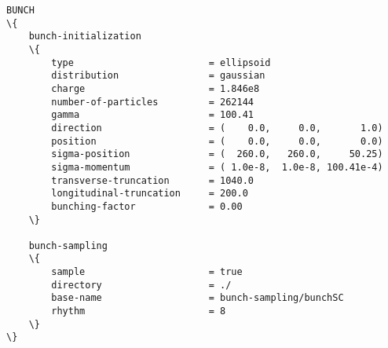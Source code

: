 \begin{appendices}
\begin{snugshade}
\begin{Verbatim}[fontsize=\footnotesize, tabsize=4, fontfamily=courier, fontseries=b, commandchars=\\\{\}, obeytabs]
BUNCH
\{
	bunch-initialization
	\{
		type						= ellipsoid
		distribution				= gaussian
		charge						= 1.846e8
		number-of-particles			= 262144
		gamma						= 100.41
		direction					= (    0.0,     0.0,       1.0)
		position					= (    0.0,     0.0,       0.0)
		sigma-position				= (  260.0,   260.0,     50.25)
		sigma-momentum				= ( 1.0e-8,  1.0e-8, 100.41e-4)
		transverse-truncation		= 1040.0
		longitudinal-truncation		= 200.0
		bunching-factor				= 0.00
	\}
	
	bunch-sampling
	\{
		sample						= true
		directory					= ./
		base-name					= bunch-sampling/bunchSC
		rhythm						= 8
	\}
\}
\end{Verbatim}
\end{snugshade}

\end{appendices}